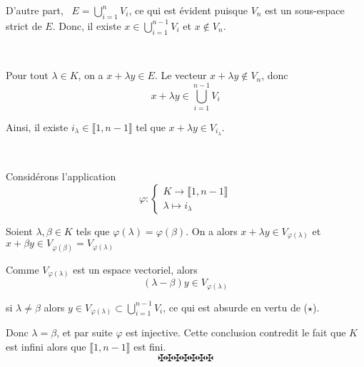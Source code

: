 D'autre part, \ $E = \bigcup_{i = 1}^n V_i$, ce qui est {\'e}vident puisque
$V_n$ est un sous-espace strict de $E$. Donc, il existe $x \in \bigcup_{i =
1}^{n - 1} V_i$ et $x \nin V_n$.

\

Pour tout $\lambda \in K$, on a $x + \lambda y \in E$. Le vecteur $x +
\lambda y \nin V_n$, donc
\[ x + \lambda y \in \bigcup_{i = 1}^{n - 1} V_i \]


Ainsi, il existe $i_{\lambda} \in \llbracket 1, n - 1 \rrbracket$ tel que $x
+ \lambda y \in V_{i_{\lambda}}$.

\

Consid{\'e}rons l'application
\[ \varphi : \left\{\begin{array}{l}
     K \to \llbracket 1, n - 1 \rrbracket\\
     \lambda \mapsto i_{\lambda}
   \end{array}\right. \]


Soient $\lambda, \beta \in K$ tels que $\varphi (\lambda) = \varphi (\beta)$.
On a alors $x + \lambda y \in V_{\varphi (\lambda)}$ et $x + \beta y \in
V_{\varphi (\beta)} = V_{\varphi (\lambda)}$

Comme $V_{\varphi (\lambda)}$ est un espace vectoriel, alors
\[ (\lambda - \beta) y \in V_{\varphi (\lambda)} \]


si $\lambda \neq \beta$ alors $y \in V_{\varphi (\lambda)} \subset \bigcup_{i
= 1}^{n - 1} V_i$, ce qui est absurde en vertu de ($\star$).

Donc $\lambda = \beta$, et par suite $\varphi$ est injective. Cette conclusion
contredit le fait que $K$ est infini alors que $\llbracket 1, n - 1
\rrbracket$ est fini.
\[ \maltese \maltese \maltese \maltese \maltese \maltese \maltese \]
